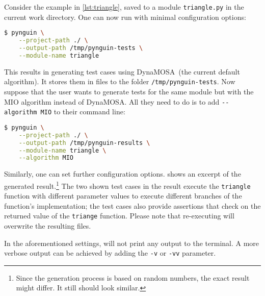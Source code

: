 Consider the example in \cref{lst:triangle},
saved to a module \texttt{triangle.py} in the current work directory.
%
One can now run \pynguin with minimal configuration options:
%
\begin{lstlisting}[language=bash]
$ pynguin \
    --project-path ./ \
    --output-path /tmp/pynguin-tests \
    --module-name triangle
\end{lstlisting}
%
This results in \pynguin generating test cases using DynaMOSA~(the current
default algorithm).
%
It stores them in files to the folder \texttt{/tmp/pynguin-tests}.
%
Now suppose that the user wants to generate tests for the same module
but with the MIO algorithm instead of DynaMOSA.
%
All they need to do is to add \verb!--algorithm MIO! to their command line:
%
\begin{lstlisting}[language=bash]
$ pynguin \
    --project-path ./ \
    --output-path /tmp/pynguin-results \
    --module-name triangle \
    --algorithm MIO
\end{lstlisting}
%
Similarly,
one can set further configuration options.
%
\Cref{lst:test-triangle} shows an excerpt of the generated result.\footnote{%
  Since the generation process is based on random numbers,
  the exact result might differ.
  It still should look similar.
}
%
The two shown test cases in the result
execute the \lstinline[language=python]!triangle! function
with different parameter values
to execute different branches of the function's implementation;
the test cases also provide assertions
that check on the returned value of the \lstinline[language=python]!triange!
function.
%
Please note that re-executing \pynguin will overwrite the resulting files.
%





In the aforementioned settings,
\pynguin will not print any output to the terminal.
%
A more verbose output can be achieved by adding the \texttt{-v}
or \texttt{-vv} parameter.
%


